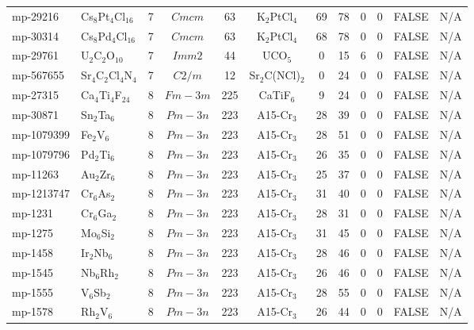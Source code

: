 {\begin{longtable}{llcccccccccc}
    mp-29216 & Cs$_{8}$Pt$_{4}$Cl$_{16}$ & 7     & $Cmcm$ & 63    & K$_{2}$PtCl$_{4}$ & 69    & 78    & 0     & 0     & FALSE & N/A \\
    mp-30314 & Cs$_{8}$Pd$_{4}$Cl$_{16}$ & 7     & $Cmcm$ & 63    & K$_{2}$PtCl$_{4}$ & 68    & 78    & 0     & 0     & FALSE & N/A \\
    mp-29761 & U$_{2}$C$_{2}$O$_{10}$ & 7     & $Imm2$ & 44    & UCO$_{5}$ & 0     & 15    & 6     & 0     & FALSE & N/A \\
    mp-567655 & Sr$_{4}$C$_{2}$Cl$_{4}$N$_{4}$ & 7     & $C2/m$ & 12    & Sr$_{2}$C(NCl)$_{2}$ & 0     & 24    & 0     & 0     & FALSE & N/A \\
    mp-27315 & Ca$_{4}$Ti$_{4}$F$_{24}$ & 8     & $Fm-3m$ & 225   & CaTiF$_{6}$ & 9     & 24    & 0     & 0     & FALSE & N/A \\
    mp-30871 & Sn$_{2}$Ta$_{6}$ & 8     & $Pm-3n$ & 223   & A15-Cr$_{3}$ & 28    & 39    & 0     & 0     & FALSE & N/A \\
    mp-1079399 & Fe$_{2}$V$_{6}$ & 8     & $Pm-3n$ & 223   & A15-Cr$_{3}$ & 28    & 51    & 0     & 0     & FALSE & N/A \\
    mp-1079796 & Pd$_{2}$Ti$_{6}$ & 8     & $Pm-3n$ & 223   & A15-Cr$_{3}$ & 26    & 35    & 0     & 0     & FALSE & N/A \\
    mp-11263 & Au$_{2}$Zr$_{6}$ & 8     & $Pm-3n$ & 223   & A15-Cr$_{3}$ & 25    & 37    & 0     & 0     & FALSE & N/A \\
    mp-1213747 & Cr$_{6}$As$_{2}$ & 8     & $Pm-3n$ & 223   & A15-Cr$_{3}$ & 31    & 40    & 0     & 0     & FALSE & N/A \\
    mp-1231 & Cr$_{6}$Ga$_{2}$ & 8     & $Pm-3n$ & 223   & A15-Cr$_{3}$ & 28    & 31    & 0     & 0     & FALSE & N/A \\
    mp-1275 & Mo$_{6}$Si$_{2}$ & 8     & $Pm-3n$ & 223   & A15-Cr$_{3}$ & 31    & 45    & 0     & 0     & FALSE & N/A \\
    mp-1458 & Ir$_{2}$Nb$_{6}$ & 8     & $Pm-3n$ & 223   & A15-Cr$_{3}$ & 28    & 46    & 0     & 0     & FALSE & N/A \\
    mp-1545 & Nb$_{6}$Rh$_{2}$ & 8     & $Pm-3n$ & 223   & A15-Cr$_{3}$ & 26    & 46    & 0     & 0     & FALSE & N/A \\
    mp-1555 & V$_{6}$Sb$_{2}$ & 8     & $Pm-3n$ & 223   & A15-Cr$_{3}$ & 28    & 55    & 0     & 0     & FALSE & N/A \\
    mp-1578 & Rh$_{2}$V$_{6}$ & 8     & $Pm-3n$ & 223   & A15-Cr$_{3}$ & 26    & 44    & 0     & 0     & FALSE & N/A \\

\end{longtable}}
